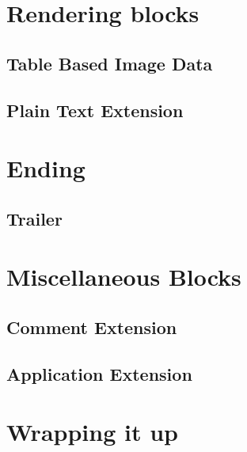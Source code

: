 \begin{refsection}
  \section{Rendering blocks}

  \subsection{Table Based Image Data}

  \subsection{Plain Text Extension}

  \section{Ending}

  \subsection{Trailer}

  \section{Miscellaneous Blocks}

  \subsection{Comment Extension}

  \subsection{Application Extension}

  \section{Wrapping it up}


  \printbibliography[heading=subbibliography]

\end{refsection}
